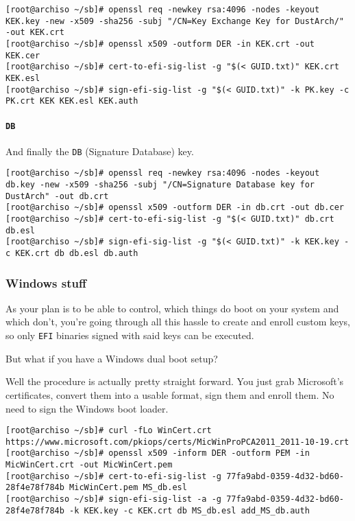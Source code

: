 \documentclass[10pt]{dustdoc}
\begin{document}
\begin{verbatim}
[root@archiso ~/sb]# openssl req -newkey rsa:4096 -nodes -keyout KEK.key -new -x509 -sha256 -subj "/CN=Key Exchange Key for DustArch/" -out KEK.crt
[root@archiso ~/sb]# openssl x509 -outform DER -in KEK.crt -out KEK.cer
[root@archiso ~/sb]# cert-to-efi-sig-list -g "$(< GUID.txt)" KEK.crt KEK.esl
[root@archiso ~/sb]# sign-efi-sig-list -g "$(< GUID.txt)" -k PK.key -c PK.crt KEK KEK.esl KEK.auth
\end{verbatim}

\paragraph{\texttt{DB}}
\label{par:db}

And finally the \texttt{DB} (Signature Database) key.

\begin{verbatim}
[root@archiso ~/sb]# openssl req -newkey rsa:4096 -nodes -keyout db.key -new -x509 -sha256 -subj "/CN=Signature Database key for DustArch" -out db.crt
[root@archiso ~/sb]# openssl x509 -outform DER -in db.crt -out db.cer
[root@archiso ~/sb]# cert-to-efi-sig-list -g "$(< GUID.txt)" db.crt db.esl
[root@archiso ~/sb]# sign-efi-sig-list -g "$(< GUID.txt)" -k KEK.key -c KEK.crt db db.esl db.auth
\end{verbatim}

\subsubsection{Windows stuff}
\label{sec:windows-stuff}

As your plan is to be able to control, which things do boot on your system and which don’t, you’re going through all this hassle to create and enroll custom keys, so only \texttt{EFI} binaries signed with said keys can be executed.

But what if you have a Windows dual boot setup?

Well the procedure is actually pretty straight forward.
You just grab Microsoft’s certificates, convert them into a usable format, sign them and enroll them.
No need to sign the Windows boot loader.

\begin{verbatim}
[root@archiso ~/sb]# curl -fLo WinCert.crt https://www.microsoft.com/pkiops/certs/MicWinProPCA2011_2011-10-19.crt
[root@archiso ~/sb]# openssl x509 -inform DER -outform PEM -in MicWinCert.crt -out MicWinCert.pem
[root@archiso ~/sb]# cert-to-efi-sig-list -g 77fa9abd-0359-4d32-bd60-28f4e78f784b MicWinCert.pem MS_db.esl
[root@archiso ~/sb]# sign-efi-sig-list -a -g 77fa9abd-0359-4d32-bd60-28f4e78f784b -k KEK.key -c KEK.crt db MS_db.esl add_MS_db.auth
\end{verbatim}
\end{document}
